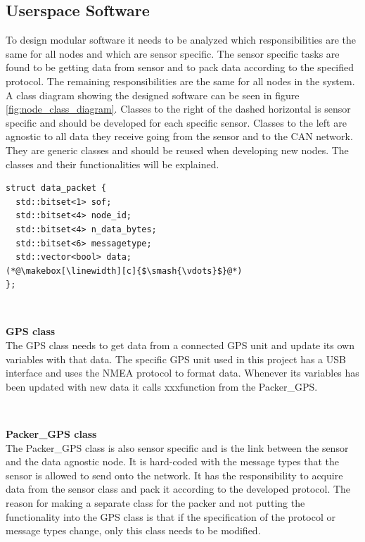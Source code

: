 \subsection{Userspace Software}
To design modular software it needs to be analyzed which responsibilities are the same for all nodes and which are sensor specific.
The sensor specific tasks are found to be getting data from sensor and to pack data according to the specified protocol.
The remaining responsibilities are the same for all nodes in the system. 
A class diagram showing the designed software can be seen in figure \ref{fig:node_class_diagram}.
Classes to the right of the dashed horizontal is sensor specific and should be developed for each specific sensor.
Classes to the left are agnostic to all data they receive going from the sensor and to the CAN network.
They are generic classes and should be reused when developing new nodes.
The classes and their functionalities will be explained.


\begin{lstlisting}[caption=Struct for data packet.,label=code:data_packet]
struct data_packet {
  std::bitset<1> sof;
  std::bitset<4> node_id;
  std::bitset<4> n_data_bytes;
  std::bitset<6> messagetype;
  std::vector<bool> data;
(*@\makebox[\linewidth][c]{$\smash{\vdots}$}@*)
};
\end{lstlisting}


~\\ \par \textbf{GPS class} ~ \\
The GPS class needs to get data from a connected GPS unit and update its own variables with that data.
The specific GPS unit used in this project has a USB interface and uses the NMEA protocol to format data.
Whenever its variables has been updated with new data it calls xxxfunction from the Packer\_GPS.

~\\ \par \textbf{Packer\_GPS class} ~ \\
The Packer\_GPS class is also sensor specific and is the link between the sensor and the data agnostic node.
It is hard-coded with the message types that the sensor is allowed to send onto the network.
It has the responsibility to acquire data from the sensor class and pack it according to the developed protocol.
The reason for making a separate class for the packer and not putting the functionality into the GPS class is that if the specification of the protocol or message types change, only this class needs to be modified.

